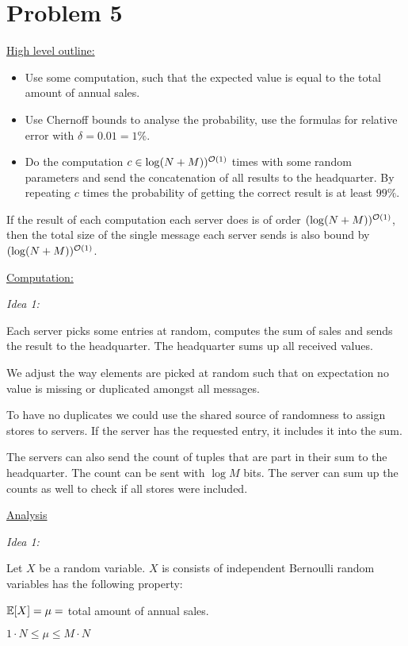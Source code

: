 \section*{Problem 5}

\underline{High level outline:}

\begin{itemize}
    \item Use some computation, such that the expected value is equal to the total amount of annual sales.
    \item Use Chernoff bounds to analyse the probability, use the formulas for relative error with $\delta = 0.01 = 1\%$. 
    \item Do the computation $c \in \log (N + M))^{\mathcal{O}(1)}$ times with some random parameters and send the concatenation of all results to the headquarter. By repeating $c$ times the probability of getting the correct result is at least $99\%$.
\end{itemize}

If the result of each computation each server does is of order $(\log (N + M))^{\mathcal{O}(1)}$, then the total size of the single message each server sends is also bound by $(\log (N + M))^{\mathcal{O}(1)}$.

\underline{Computation:}

\textit{Idea 1:}

Each server picks some entries at random, computes the sum of sales and sends the result to the headquarter. The headquarter sums up all received values. 

We adjust the way elements are picked at random such that on expectation no value is missing or duplicated amongst all messages.

To have no duplicates we could use the shared source of randomness to assign stores to servers. If the server has the requested entry, it includes it into the sum.

The servers can also send the count of tuples that are part in their sum to the headquarter. The count can be sent with $\log M$ bits. The server can sum up the counts as well to check if all stores were included.

\underline{Analysis}

\textit{Idea 1:}

Let $X$ be a random variable. $X$ is consists of independent Bernoulli random variables has the following property:

$\mathbb{E}[X] = \mu = $ total amount of annual sales.

$1 \cdot N \leq \mu \leq M \cdot N$



